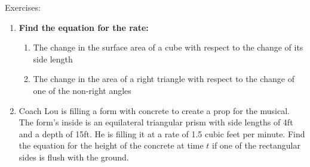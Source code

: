 \documentclass[../revisedmain.tex]{subfiles}
\begin{document}
	\newpage
\begin{center}
	\LARGE Exercises:
\end{center}
\begin{enumerate}
	\item \textbf{Find the equation for the rate:}
	\begin{enumerate}
		\item The change in the surface area of a cube with respect to the change of its side length
		\item The change in the area of a right triangle with respect to the change of one of the non-right angles
	\end{enumerate}
	\item Coach Lou is filling a form with concrete to create a prop for the musical. The form's inside is an equilateral triangular prism with side lengths of 4ft and a depth of 15ft. He is filling it at a rate of 1.5 cubic feet per minute. Find the equation for the height of the concrete at time $t$ if one of the rectangular sides is flush with the ground.
\end{enumerate}
\end{document}
